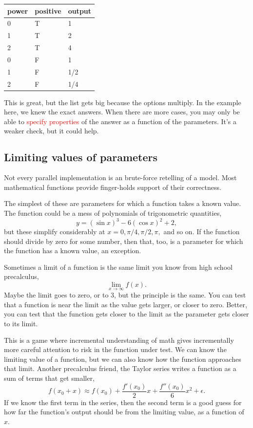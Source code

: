 \documentclass[fleqn,10pt]{olplainarticle}
\newcommand{\aside}[1]{\textcolor{red}{#1}}
\begin{document}
\begin{center}
\begin{tabular}{|l|l|l|}\hline
power & positive &output \\ \hline
0 & T & 1 \\
1 & T & 2 \\
2 & T & 4 \\
0 & F & 1 \\
1 & F & 1/2 \\
2 & F & 1/4 \\ \hline
\end{tabular}
\end{center}

This is great, but the list gets big because the options multiply.
In the example here, we knew the exact answers.
When there are more cases, you may only be able to \aside{specify properties} of the
answer as a function of the parameters. It's a weaker check,
but it could help.

\subsection{Limiting values of parameters}\label{sec:limits}

Not every parallel implementation is an brute-force retelling
of a model. Most mathematical functions provide finger-holds
support of their correctness.

The simplest of these are parameters for which a function
takes a known value. The function could be a mess of
polynomials of trigonometric quantities,
\begin{equation}
  y = (\sin x)^3 - 6 (\cos x)^2 + 2,
\end{equation}
but these simplify considerably at $x=0, \pi/4, \pi/2, \pi,$
and so on. If the function should divide by zero for some
number, then that, too, is a parameter for which the function
has a known value, an exception.

Sometimes a limit of a function is the same limit you know
from high school precalculus,
\begin{equation}
  \lim_{x\rightarrow\infty} f(x).
\end{equation}
Maybe the limit goes to zero, or to 3, but the principle is
the same. You can test that a function is near the limit
as the value gets larger, or closer to zero. Better, you can
test that the function gets closer to the limit as the
parameter gets closer to its limit.

This is a game where incremental understanding of math
gives incrementally more careful attention to risk in the
function under test. We can know the limiting value of a
function, but we can also know how the function approaches
that limit. Another precalculus friend, the Taylor series
writes a function as a sum of terms that get smaller,
\begin{equation}
  f(x_0+x) \approx f(x_0) + \frac{f'(x_0)}{2}x + \frac{f''(x_0)}{6}x^2 + \epsilon.
\end{equation}
If we know the first term in the series, then the second term
is a good guess for how far the function's output should be from
the limiting value, as a function of $x$.
\end{document}
